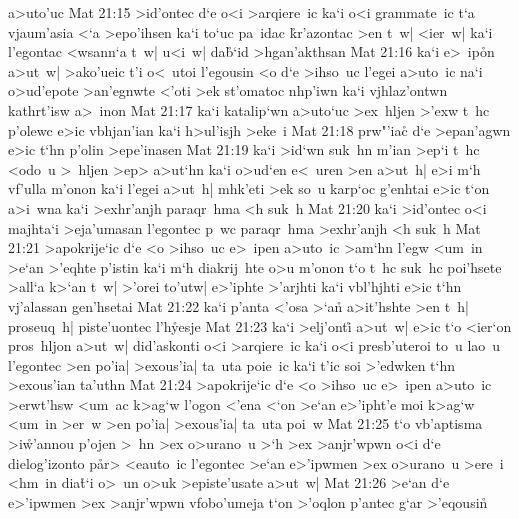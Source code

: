 a>uto'uc\bibvsend
\vs Mat 21:15
>id'ontec
d`e
o<i
>arqiere~ic
ka`i
o<i
grammate~ic
t`a
vjaum'asia
<`a
>epo'ihsen
ka`i
to`uc
pa~idac
\r{k}r'azontac
>en
t~w|
<ier~w|
ka`i
l'egontac
<wsann`a
t~w|
u<i~w|
da\r{b}`id
>hgan'akthsan\bibvsend
\vs Mat 21:16
ka`i
e>~ip\r{o}n
a>ut~w|
>ako'ueic
t'i
o<~utoi
l'egousin
<o
d`e
>ihso~uc
l'egei
a>uto~ic
na`i
o>ud'epote
>an'egnwte
<'oti
>ek
st'omatoc
nhp'iwn
ka`i
vjhlaz'ontwn
kathrt'isw
a>~inon\bibvsend
\vs Mat 21:17
ka`i
katalip`wn
a>uto`uc
>ex~hljen
>'exw
t~hc
p'olewc
e>ic
vbhjan'ian
ka`i
h>ul'isjh
>eke~i\bibvsend
\vs Mat 21:18
prw"'ia\r{c}
d`e
>epan'agwn
e>ic
t`hn
p'olin
>epe'inasen\bibvsend
\vs Mat 21:19
ka`i
>id`wn
suk~hn
m'ian
>ep`i
t~hc
<odo~u
>~hljen
>ep>
a>ut`hn
ka`i
o>ud`en
e<~uren
>en
a>ut~h|
e>i
m`h
vf'ulla
m'onon
ka`i
l'egei
a>ut~h|
mhk'eti
>ek
so~u
karp`oc
g'enhtai
e>ic
t`on
a>i~wna
ka`i
>exhr'anjh
paraqr~hma
<h
suk~h\bibvsend
\vs Mat 21:20
ka`i
>id'ontec
o<i
majhta`i
>eja'umasan
l'egontec
p~wc
paraqr~hma
>exhr'anjh
<h
suk~h\bibvsend
\vs Mat 21:21
>apokrije`ic
d`e
<o
>ihso~uc
e>~ipen
a>uto~ic
>am`hn
l'egw
<um~in
>e`an
>'eqhte
p'istin
ka`i
m`h
diakrij~hte
o>u
m'onon
t`o
t~hc
suk~hc
poi'hsete
>all`a
k>`an
t~w|
>'orei
to'utw|
e>'iphte
>'arjhti
ka`i
vbl'hjhti
e>ic
t`hn
vj'alassan
gen'hsetai\bibvsend
\vs Mat 21:22
ka`i
p'anta
<'osa
>`a\r{n}
a>it'hshte
>en
t~h|
proseuq~h|
piste'uontec
l'h\r{y}esje\bibvsend
{}
\vs Mat 21:23
ka`i
>elj'onti\r{}
a>ut~w|
e>ic
t`o
<ier`on
pros~hljon
a>ut~w|
did'askonti
o<i
>arqiere~ic
ka`i
o<i
presb'uteroi
to~u
lao~u
l'egontec
>en
po'ia|
>exous'ia|
ta~uta
poie~ic
ka`i
t'ic
soi
>'edwken
t`hn
>exous'ian
ta'uthn\bibvsend
\vs Mat 21:24
>apokrije`ic
d`e
<o
>ihso~uc
e>~ipen
a>uto~ic
>erwt'hsw
<um~ac
k>ag`w
l'ogon
<'ena
<`on
>e`an
e>'ipht'e
moi
k>ag`w
<um~in
>er~w
>en
po'ia|
>exous'ia|
ta~uta
poi~w\bibvsend
\vs Mat 21:25
t`o
vb'aptisma
>i\r{w}'annou
p'ojen
>~hn
>ex
o>urano~u
>`h
>ex
>anjr'wpwn
o<i
d`e
dielog'izonto
p\r{a}r>
<eauto~ic
l'egontec
>e`an
e>'ipwmen
>ex
o>urano~u
>ere~i
<hm~in
dia\r{t}`i
o>~un
o>uk
>episte'usate
a>ut~w|\bibvsend
\vs Mat 21:26
>e`an
d`e
e>'ipwmen
>ex
>anjr'wpwn
vfobo'umeja
t`on
>'oqlon
p'antec
g`ar
>'eqousin\r{}
